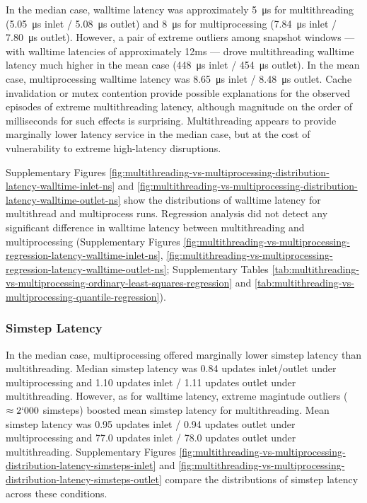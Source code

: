 In the median case, walltime latency was approximately \SI{5}{\micro\second} for multithreading (\SI{5.05}{\micro\second} inlet / \SI{5.08}{\micro\second} outlet) and \SI{8}{\micro\second} for multiprocessing (\SI{7.84}{\micro\second} inlet / \SI{7.80}{\micro\second} outlet).
However, a pair of extreme outliers among snapshot windows --- with walltime latencies of approximately 12ms --- drove multithreading walltime latency much higher in the mean case (\SI{448}{\micro\second} inlet / \SI{454}{\micro\second} outlet).
In the mean case, multiprocessing walltime latency was \SI{8.65}{\micro\second} inlet / \SI{8.48}{\micro\second} outlet.
Cache invalidation or mutex contention provide possible explanations for the observed episodes of extreme multithreading latency, although magnitude on the order of milliseconds for such effects is surprising.
Multithreading appears to provide marginally lower latency service in the median case, but at the cost of vulnerability to extreme high-latency disruptions.

Supplementary Figures \ref{fig:multithreading-vs-multiprocessing-distribution-latency-walltime-inlet-ns} and \ref{fig:multithreading-vs-multiprocessing-distribution-latency-walltime-outlet-ns} show the distributions of walltime latency for multithread and multiprocess runs.
Regression analysis did not detect any significant difference in walltime latency between multithreading and multiprocessing (Supplementary Figures \ref{fig:multithreading-vs-multiprocessing-regression-latency-walltime-inlet-ns}, \ref{fig:multithreading-vs-multiprocessing-regression-latency-walltime-outlet-ns}; Supplementary Tables \ref{tab:multithreading-vs-multiprocessing-ordinary-least-squares-regression} and \ref{tab:multithreading-vs-multiprocessing-quantile-regression}).

\subsubsection{Simstep Latency}

In the median case, multiprocessing offered marginally lower simstep latency than multithreading.
Median simstep latency was 0.84 updates inlet/outlet under multiprocessing and 1.10 updates inlet / 1.11 updates outlet under multithreading.
However, as for walltime latency, extreme magintude outliers ($\approx 2`000$ simsteps) boosted mean simstep latency for multithreading.
Mean simstep latency was 0.95 updates inlet / 0.94 updates outlet under multiprocessing and 77.0 updates inlet / 78.0 updates outlet under multithreading.
Supplementary Figures \ref{fig:multithreading-vs-multiprocessing-distribution-latency-simsteps-inlet} and \ref{fig:multithreading-vs-multiprocessing-distribution-latency-simsteps-outlet} compare the distributions of simstep latency across these conditions.

